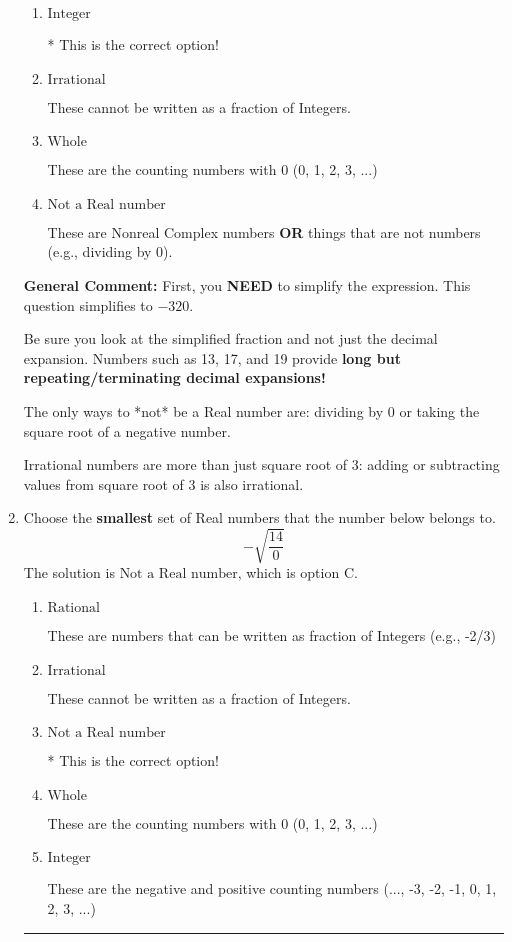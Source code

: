 \documentclass{extbook}[14pt]
\newcommand{\litem}[1]{\item #1

\rule{\textwidth}{0.4pt}}
\begin{document}
\begin{enumerate}
{\begin{enumerate}[label=\Alph*.]
These are numbers that can be written as fraction of Integers (e.g., -2/3)
\item \( \text{Integer} \)

* This is the correct option!
\item \( \text{Irrational} \)

These cannot be written as a fraction of Integers.
\item \( \text{Whole} \)

These are the counting numbers with 0 (0, 1, 2, 3, ...)
\item \( \text{Not a Real number} \)

These are Nonreal Complex numbers \textbf{OR} things that are not numbers (e.g., dividing by 0).
\end{enumerate}

\textbf{General Comment:} First, you \textbf{NEED} to simplify the expression. This question simplifies to $-320$. 
 
 Be sure you look at the simplified fraction and not just the decimal expansion. Numbers such as 13, 17, and 19 provide \textbf{long but repeating/terminating decimal expansions!} 
 
 The only ways to *not* be a Real number are: dividing by 0 or taking the square root of a negative number. 
 
 Irrational numbers are more than just square root of 3: adding or subtracting values from square root of 3 is also irrational.
}
\litem{
Choose the \textbf{smallest} set of Real numbers that the number below belongs to.
\[ -\sqrt{\frac{14}{0}} \]The solution is \( \text{Not a Real number} \), which is option C.\begin{enumerate}[label=\Alph*.]
\item \( \text{Rational} \)

These are numbers that can be written as fraction of Integers (e.g., -2/3)
\item \( \text{Irrational} \)

These cannot be written as a fraction of Integers.
\item \( \text{Not a Real number} \)

* This is the correct option!
\item \( \text{Whole} \)

These are the counting numbers with 0 (0, 1, 2, 3, ...)
\item \( \text{Integer} \)

These are the negative and positive counting numbers (..., -3, -2, -1, 0, 1, 2, 3, ...)
\end{enumerate}

}
\end{enumerate}
\end{document}
